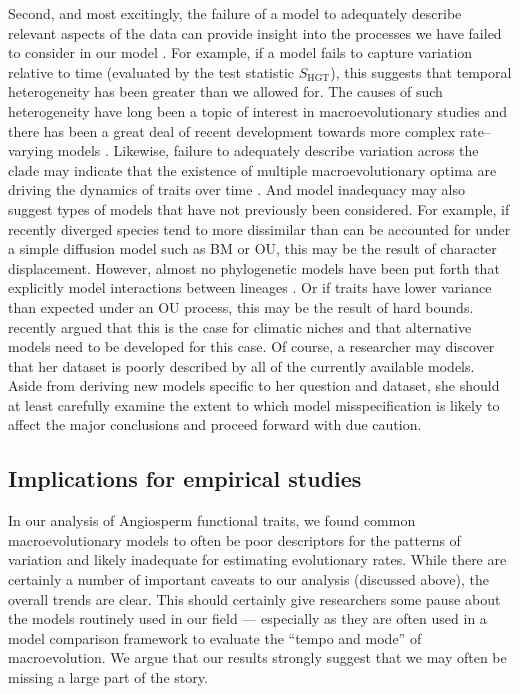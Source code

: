 \documentclass[a4paper,11pt]{article}
\begin{document}
Second, and most excitingly, the failure of a model to adequately describe relevant aspects of the data can provide insight into the processes we have failed to consider in our model \citep{Gelman2012}. For example, if a model fails to capture variation relative to time (evaluated by the test statistic $S_{\text{HGT}}$), this suggests that temporal heterogeneity has been greater than we allowed for. The causes of such heterogeneity have long been a topic of interest in macroevolutionary studies \citep[e.g.,][]{Simpson1944, Foote1997} and there has been a great deal of recent development towards more complex rate--varying models \citep[e.g.,][]{Omeara2006, Thomas2006, Eastman2011, Weir2012, RaboskyBAMM}. Likewise, failure to adequately describe variation across the clade may indicate that the existence of multiple macroevolutionary optima \citep[sensu][]{Hansen2012book} are driving the dynamics of traits over time \citep[see][for models that have been used to capture these dynamics]{Hansen1997, ButlerKing2004, Beaulieu2012, IngramMahler2013, UyedaBayou}. And model inadequacy may also suggest types of models that have not previously been considered. For example, if recently diverged species tend to more dissimilar than can be accounted for under a simple diffusion model such as BM or OU, this may be the result of character displacement. However, almost no phylogenetic models have been put forth that explicitly model interactions between lineages \citep[but see][]{NuismerHarmon}. Or if traits have lower variance than expected under an OU process, this may be the result of hard bounds. \citet{Davies2014} recently argued that this is the case for climatic niches and that alternative models need to be developed for this case. Of course, a researcher may discover that her dataset is poorly described by all of the currently available models. Aside from deriving new models specific to her question and dataset, she should at least carefully examine the extent to which model misspecification is likely to affect the major conclusions and proceed forward with due caution.
 
\subsection{Implications for empirical studies}

In our analysis of Angiosperm functional traits, we found common macroevolutionary models to often be poor descriptors for the patterns of variation and likely inadequate for estimating evolutionary rates. While there are certainly a number of important caveats to our analysis (discussed above), the overall trends are clear. This should certainly give researchers some pause about the models routinely used in our field --- especially as they are often used in a model comparison framework to evaluate the ``tempo and mode'' of macroevolution. We argue that our results strongly suggest that we may often be missing a large part of the story.
\end{document}

